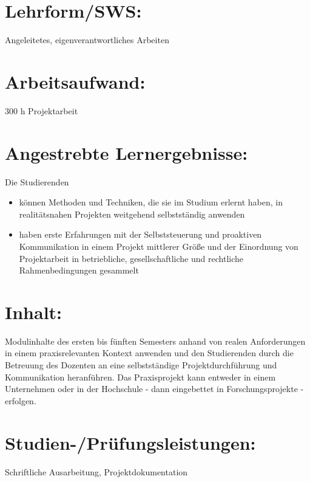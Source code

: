 \section*{Lehrform/SWS:}\label{lehrformsws-18}

Angeleitetes, eigenverantwortliches Arbeiten

\section*{Arbeitsaufwand:}\label{arbeitsaufwand-17}

300 h Projektarbeit

\section*{Angestrebte
Lernergebnisse:}\label{angestrebte-lernergebnisse-18}

Die Studierenden

\begin{itemize}
\item
  können Methoden und Techniken, die sie im Studium erlernt haben, in
  realitätsnahen Projekten weitgehend selbstständig anwenden
\item
  haben erste Erfahrungen mit der Selbststeuerung und proaktiven
  Kommunikation in einem Projekt mittlerer Größe und der Einordnung von
  Projektarbeit in betriebliche, gesellschaftliche und rechtliche
  Rahmenbedingungen gesammelt
\end{itemize}

\section*{Inhalt:}\label{inhalt-18}

Modulinhalte des ersten bis fünften Semesters anhand von realen
Anforderungen in einem praxisrelevanten Kontext anwenden und den
Studierenden durch die Betreuung des Dozenten an eine selbstständige
Projektdurchführung und Kommunikation heranführen. Das Praxisprojekt
kann entweder in einem Unternehmen oder in der Hochschule - dann
eingebettet in Forschungsprojekte - erfolgen.

\section*{Studien-/Prüfungsleistungen:}\label{studien-pruxfcfungsleistungen-16}

Schriftliche Ausarbeitung, Projektdokumentation

